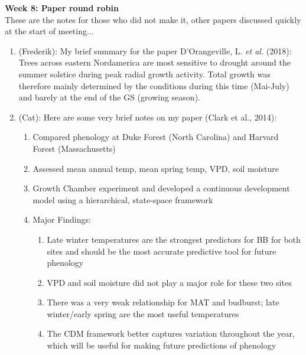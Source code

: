 \documentclass[11pt,letter]{article}
\begin{document}
{\bf Week 8: Paper round robin}\\
These are the notes for those who did not make it, other papers discussed quickly at the start of meeting... 
\begin{enumerate}
\item (Frederik): My brief summary for the paper D'Orangeville, L. \emph{et al.} (2018):
Trees across eastern Nordamerica are most sensitive to drought around the summer solstice during peak radial growth activity. Total growth was therefore mainly determined by the conditions during this time (Mai-July) and barely at the end of the GS (growing season).
\item (Cat): Here are some very brief notes on my paper (Clark et al., 2014):
\begin{enumerate}
\item Compared phenology at Duke Forest (North Carolina) and Harvard Forest (Massachusetts)
\item     Assessed mean annual temp, mean spring temp, VPD, soil moisture
\item     Growth Chamber experiment and developed a continuous development model using a hierarchical, state-space framework
 \item    Major Findings:
 \begin{enumerate}
 \item     Late winter temperatures are the strongest predictors for BB for both sites and should be the most accurate predictive tool for future phenology
 \item       VPD and soil moisture did not play a major role for these two sites
 \item       There was a very weak relationship for MAT and budburst; late winter/early spring are the most useful temperatures
 \item       The CDM framework better captures variation throughout the year, which will be useful for making future predictions of phenology
\end{enumerate}
\end{enumerate}
\end{enumerate}
\end{document}
